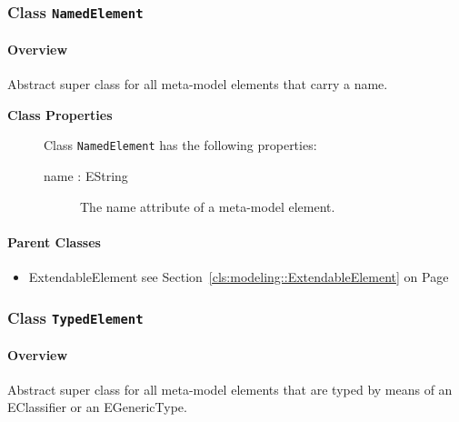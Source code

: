 \subsubsection{\Large{Class \bfseries \texttt{NamedElement}\normalfont}}
\label{cls:modeling::NamedElement} 
\paragraph{Overview}

	
			
Abstract super class for all meta-model elements that carry a name. 	
		
	


\begin{description}

	\item[\textbf{Class Properties}] Class \texttt{NamedElement} has the following properties:
	\begin{description}
\item[name : EString 	]

\hspace{\fill}
\nopagebreak


	
			
The name attribute of a meta-model element.	
		
	
	\end{description}
	
	

\end{description}

\paragraph{Parent Classes}
\begin{itemize}
\item ExtendableElement see Section~\ref{cls:modeling::ExtendableElement} on Page~\pageref{cls:modeling::ExtendableElement}\end{itemize}
\subsubsection{\Large{Class \bfseries \texttt{TypedElement}\normalfont}}
\label{cls:modeling::TypedElement} 
\paragraph{Overview}

	
			
Abstract super class for all meta-model elements that are typed by means of an EClassifier or an EGenericType.	
		

